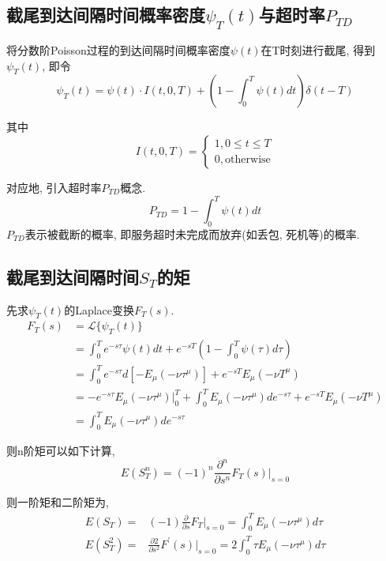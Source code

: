 \documentclass[a4paper, 12pt]{ctexart}
\begin{document}
\subsection{截尾到达间隔时间概率密度$\psi _T(t)$与超时率$P_{TD}$}
将分数阶Poisson过程的到达间隔时间概率密度$\psi(t)$在T时刻进行截尾, 得到$\psi _T(t)$, 即令
\begin{equation}
\psi _T(t)=\psi (t)\cdot I(t,0,T) +(1-\int _0^T \psi (t)dt)\delta (t-T)
\end{equation}

其中
\begin{equation}
I(t,0,T)=\begin{cases}
1, 0\leq t\leq T\\
0, \text{otherwise}
\end{cases}
\end{equation}

对应地, 引入超时率$P_{TD}$概念.
\begin{equation}
P_{TD}=1-\int_0^T\psi(t)dt\label{eq:defTD}
\end{equation}
$P_{TD}$表示被截断的概率, 即服务超时未完成而放弃(如丢包, 死机等)的概率.

\subsection{截尾到达间隔时间$S_T$的矩}
先求$\psi _T (t)$的Laplace变换$F_T(s)$.
\begin{equation}
\begin{split}
F _T(s)&=\mathcal{L}\{\psi _T (t)\}\\
&=\int _0^T e^{-s\tau}\psi (t)dt+e^{-sT}(1-\int _0^T \psi (\tau)d\tau)\\
&=\int _0^T e^{-s\tau}d[-E_{\mu}(-\nu \tau ^{\mu})]+e^{-sT}E_{\mu}(-\nu T^{\mu})\\
&=-e^{-s\tau}E_\mu(-\nu\tau^\mu)\bigg|_0^T+\int_0^TE_\mu(-\nu\tau^\mu)de^{-s\tau}+e^{-sT}E_{\mu}(-\nu T^{\mu})\\
&=\int_0^TE_\mu(-\nu\tau^\mu)de^{-s\tau}
\end{split}
\end{equation}

则n阶矩可以如下计算,
\begin{equation}
E(S_T^{n})=(-1)^n\frac{\partial^n}{\partial s^n}F_T(s)\bigg|_{s=0}
\end{equation}

则一阶矩和二阶矩为,
\begin{align}
E(S_T)=&(-1)\frac{\partial}{\partial s}F_T\bigg|_{s=0}
=\int_0^TE_\mu(-\nu\tau^\mu)d\tau  \label{eq:EST}\\
E(S_T^{2})=&\frac{\partial2}{\partial s^2}F^\prime(s)\bigg|_{s=0}
=2\int_0^T\tau E_\mu(-\nu\tau^\mu)d\tau\label{eq:ES2T}
\end{align}
\end{document}
